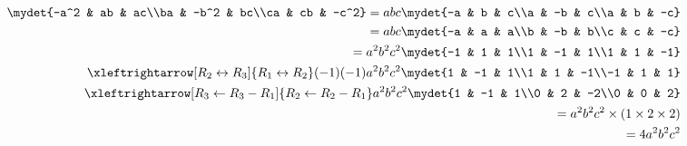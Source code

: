 \begin{align}
\mydet{-a^2 & ab & ac\\ba & -b^2 & bc\\ca & cb & -c^2} = abc\mydet{-a & b & c\\a & -b & c\\a & b & -c}\\
= abc\mydet{-a & a & a\\b & -b & b\\c & c & -c}\\
= a^2b^2c^2\mydet{-1 & 1 & 1\\1 & -1 & 1\\1 & 1 & -1}\\
\xleftrightarrow[R_2 \leftrightarrow R_3]{R_1 \leftrightarrow R_2}(-1)(-1)a^2b^2c^2\mydet{1 & -1 & 1\\1 & 1 & -1\\-1 & 1 & 1}\\
\xleftrightarrow[R_3 \leftarrow R_3 - R_1]{R_2 \leftarrow R_2 - R_1}a^2b^2c^2\mydet{1 & -1 & 1\\0 & 2 & -2\\0 & 0 & 2}\\
= a^2b^2c^2 \times \left(1 \times 2 \times 2\right)\\
= 4a^2b^2c^2
\end{align}
